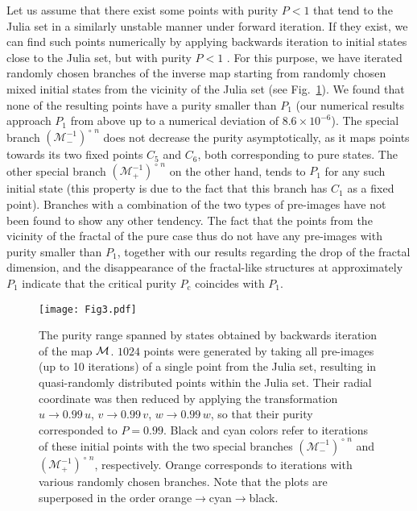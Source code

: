\documentclass[%
 aip,
 amsmath,amssymb,
 reprint,%
]{revtex4-1}
\begin{document}
Let us assume that there exist some points with purity $P\!<\! 1$ that tend to the Julia set in a similarly unstable manner under forward iteration. If they exist, we can find such points numerically by applying backwards iteration to initial states close to the Julia set\cite{Kalmanarxiv}, but with purity $P\!< \!1$ . For this purpose, we have iterated randomly chosen branches of the inverse map starting from randomly chosen mixed initial states from the vicinity of the Julia set (see Fig.~\ref{deltaP}). We found that none of the resulting points have a purity smaller than $P_{1}$ (our numerical results approach $P_{1}$ from above up to a numerical deviation of $8.6\times 10^{-6}$). The special branch $\left({\mathcal M}^{-1}_{-}\right)^{\!\circ\, n}$ does not decrease the purity asymptotically, as it maps points towards its two fixed points $C_{5}$ and $C_{6}$, both corresponding to pure states. The other special branch $\left({\mathcal M}^{-1}_{+}\right)^{\!\circ\, n}$ on the other hand, tends to $P_{1}$ for any such initial state (this property is due to the fact that this branch has $C_{1}$ as a fixed point). Branches with a combination of the two types of pre-images have not been found to show any other tendency. The fact that the points from the vicinity of the fractal of the pure case thus do not have any pre-images with purity smaller than $P_{1}$, together with our results regarding the drop of the fractal dimension, and the disappearance of the fractal-like structures at approximately $P_{1}$ indicate that the critical purity $P_{\mathrm{c}}$ coincides with $P_{1}$.  


\begin{figure}
\texttt{[image: Fig3.pdf]}
\caption{The purity range spanned by states obtained by backwards iteration of the map ${\cal M}$.  $1024$ points were generated by taking all pre-images (up to 10 iterations) of a single point from the Julia set, resulting in quasi-randomly distributed points within the Julia set. Their radial coordinate was then reduced by applying the transformation $u\rightarrow 0.99\,u$, $v\rightarrow 0.99\,v$, $w\rightarrow 0.99\,w$, so that their purity corresponded to $P=0.99$. Black and cyan colors refer to iterations of these initial points with the two special branches  $\left({\mathcal M}^{-1}_{-}\right)^{\!\circ\, n}$ and  $\left({\mathcal M}^{-1}_{+}\right)^{\!\circ\, n}$, respectively. Orange corresponds to iterations with various randomly chosen branches. Note that the plots are superposed in the order orange$\rightarrow$cyan$\rightarrow$black. }
\label{deltaP}
\end{figure} 
\end{document}
